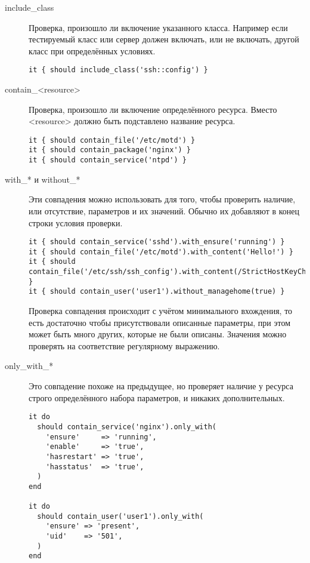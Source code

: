 \begin{description}
\item[include\_class]
Проверка, произошло ли включение указанного класса. Например если тестируемый класс или сервер должен включать, или не включать, другой класс при определённых условиях.

\begin{lstlisting}
it { should include_class('ssh::config') }
\end{lstlisting}

\item[contain\_\textless{}resource\textgreater{}]
Проверка, произошло ли включение определённого ресурса. Вместо \textless{}resource\textgreater{} должно быть подставлено название ресурса.

\begin{lstlisting}
it { should contain_file('/etc/motd') }
it { should contain_package('nginx') }
it { should contain_service('ntpd') }
\end{lstlisting}

\item[with\_* и without\_*]
Эти совпадения можно использовать для того, чтобы проверить наличие, или отсутствие, параметров и их значений. Обычно их добавляют в конец строки условия проверки.

\begin{lstlisting}
it { should contain_service('sshd').with_ensure('running') }
it { should contain_file('/etc/motd').with_content('Hello!') }
it { should contain_file('/etc/ssh/ssh_config').with_content(/StrictHostKeyChecking\s+no/) }
it { should contain_user('user1').without_managehome(true) }
\end{lstlisting}

Проверка совпадения происходит с учётом минимального вхождения, то есть достаточно чтобы присутствовали описанные параметры, при этом может быть много других, которые не были описаны. Значения можно проверять на соответствие регулярному выражению.

\item[only\_with\_*]
Это совпадение похоже на предыдущее, но проверяет наличие у ресурса строго определённого набора параметров, и никаких дополнительных.

\begin{lstlisting}
it do
  should contain_service('nginx').only_with(
    'ensure'     => 'running',
    'enable'     => 'true',
    'hasrestart' => 'true',
    'hasstatus'  => 'true',
  )
end

it do
  should contain_user('user1').only_with(
    'ensure' => 'present',
    'uid'    => '501',
  )
end
\end{lstlisting}


\end{description}
